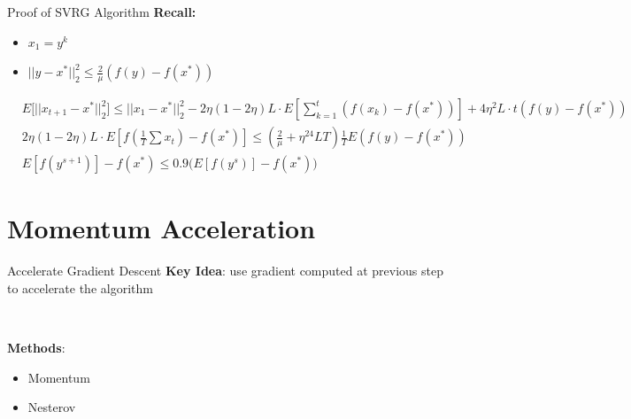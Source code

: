 \documentclass[aspectratio=169,xcolor=dvipsnames]{beamer}
\begin{document}

\begin{frame}{Proof of SVRG Algorithm}
\textbf{Recall:}
\begin{itemize}
	\item $x_1 = y^k$
	\item $||y - x^*||_2^2 \le \frac{2}{\mu}(f(y) - f(x^*))$
\end{itemize}

\begin{align*}
	&E\Big[ || x_{t+1} - x^* ||_2^2 \Big]  \le ||x_1 - x^*||_2^2 - 2\eta(1-2\eta)L\cdot E[\sum_{k=1}^t (f(x_k) - f(x^*)) ] + 4\eta^2L\cdot t(f(y) - f(x^*))\\
	&2\eta(1-2\eta)L\cdot E[f(\frac{1}{T}\sum x_t) - f(x^*) ] \le (\frac{2}{\mu} + \eta^24LT ) \frac{1}{T} E(f(y) - f(x^*)) \\
	& E[f(y^{s+1})] - f(x^*) \le 0.9 \big( E[f(y^s)] - f(x^*)\big)
\end{align*}


\end{frame}


\section{Momentum Acceleration}


\begin{frame}{Accelerate Gradient Descent}
\large
\textbf{Key Idea}: 
use gradient computed at previous step to accelerate the algorithm

\

\textbf{Methods}:

	\begin{itemize}
		\item Momentum
		\item Nesterov
	\end{itemize}

\end{frame}


\end{document}
